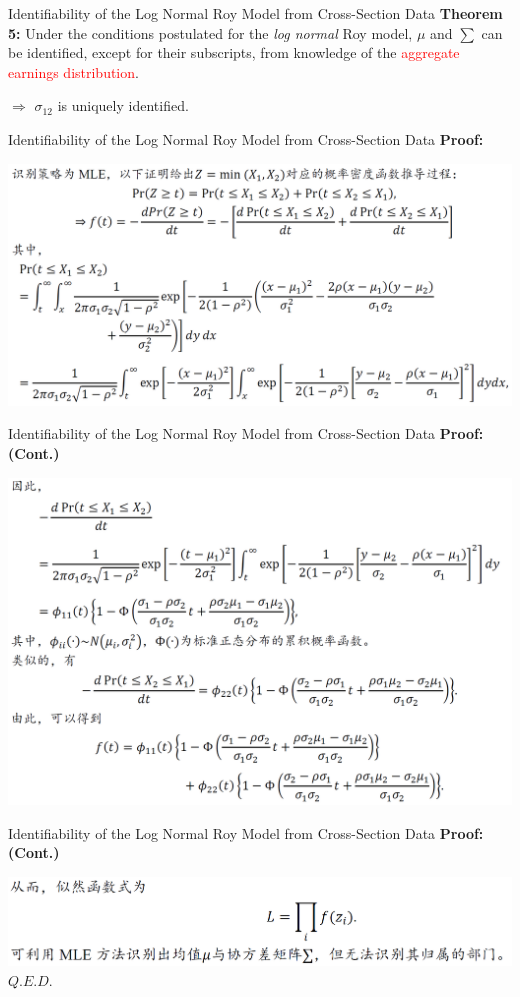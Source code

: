 \documentclass{beamer}
\begin{document}
\begin{frame}{Identifiability of the Log Normal Roy Model from Cross-Section Data}
	\textbf{Theorem 5:} Under the conditions postulated for the \textit{log normal} Roy model, $\mu$ and $\sum $ can be identified, except for their subscripts, from knowledge of the \textcolor{red}{aggregate earnings distribution}.

	\bigskip
	$\Rightarrow$ $\sigma_{12}$ is uniquely identified.
\end{frame}
\begin{frame}{Identifiability of the Log Normal Roy Model from Cross-Section Data}
	\textbf{Proof:}
	
	\includegraphics[scale=0.5]{theorem5_1}
\end{frame}
\begin{frame}{Identifiability of the Log Normal Roy Model from Cross-Section Data}
	\textbf{Proof:(Cont.)}
	
	\includegraphics[scale=0.45]{theorem5_2}
\end{frame}
\begin{frame}{Identifiability of the Log Normal Roy Model from Cross-Section Data}
	\textbf{Proof:(Cont.)}
	
	\includegraphics[scale=0.5]{theorem5_3}
\hfill $Q.E.D.$
\end{frame}
\end{document}

